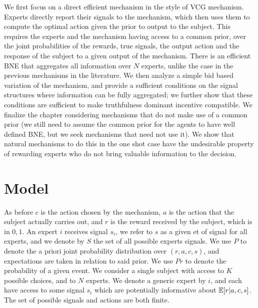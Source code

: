 We first focus on a direct efficient mechanism in the style of VCG mechanism. Experts directly report their signals to the mechanism, which then uses them to compute the optimal action given the prior to output to the subject. This requires  the experts and the mechanism having access to a common prior, over the joint probabilities of the rewards, true signals, the output action and the response of the subject to a given output of the mechanism. There is an efficient BNE that aggregates all information over $N$ experts, unlike the case in the previous mechanisms in the literature.
We then analyze a simple bid based variation of the mechanism, and provide a sufficient conditions on the signal structures where information can be fully aggregated; we further show that these conditions are sufficient to make truthfulness dominant incentive compatible.  
We finalize the chapter considering mechanisms that do not make use of a common prior (we still need to assume the common prior for the agents to have well defined BNE, but we seek mechanisms that need not use it). We show that natural mechanisms to do this in the one shot case have the undesirable property of rewarding experts who do not bring valuable information to the decision.

\section{Model}


As before $c$ is the action chosen by the mechanism, $a$ is the action that the subject actually carries out, and $r$ is the reward received by the subject, which is in ${0,1}$. An expert $i$ receives signal $s_i$, we refer to $s$ as a given et of signal for all experts, and we denote by $S$ the set of all possible experts signals.
We use $P$ to denote the a priori joint probability distribution over $(r,a,c,s)$, and expectations are taken in relation to said prior.
We use $Pr$ to denote the probability of a given event.
We consider a single subject with access to $K$ possible choices, and to $N$ experts. We denote a generic expert by $i$, and each have access to some signal $s_i$ which are potentially informative about $\operatorname*{\mathbb E}[r|a,c,s]$. The set of possible signals and actions are both finite.


